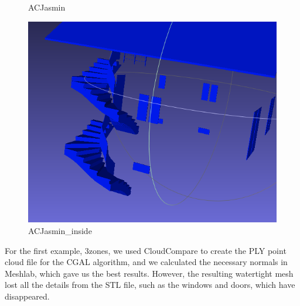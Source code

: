 \documentclass{article}
\begin{document}
\begin{figure}[H]
\begin{minipage}[t]{0.27\textwidth}
    \caption*{ACJasmin}
  \end{minipage}
  \hspace{0.05\textwidth}
  \begin{minipage}[t]{0.27\textwidth}
    \includegraphics[width=\textwidth]{../../images/screen_kinetic/ACJasmin_inside.png}
    \caption*{ACJasmin\_inside}
  \end{minipage}
\end{figure}  

For the first example, 3zones, 
we used CloudCompare to create the PLY point cloud file for the CGAL algorithm, 
and we calculated the necessary normals in Meshlab, which gave us the best results. 
However, the resulting watertight mesh lost all the details from the STL file,
such as the windows and doors, which have disappeared.
\end{document}
